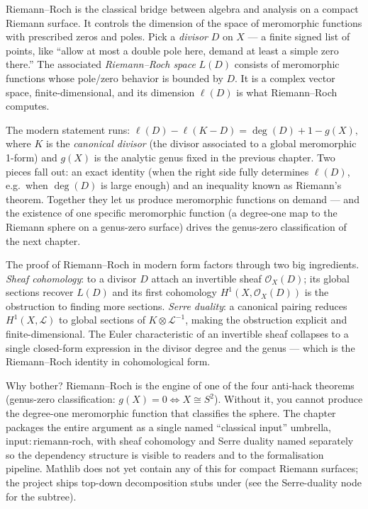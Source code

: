 \begin{layman}
Riemann--Roch is the classical bridge between algebra and analysis on
a compact Riemann surface. It controls the dimension of the space of
meromorphic functions with prescribed zeros and poles. Pick a
\emph{divisor} \(D\) on \(X\) --- a finite signed list of points, like
``allow at most a double pole here, demand at least a simple zero
there.'' The associated \emph{Riemann--Roch space} \(L(D)\) consists
of meromorphic functions whose pole/zero behavior is bounded by
\(D\). It is a complex vector space, finite-dimensional, and its
dimension \(\ell(D)\) is what Riemann--Roch computes.

The modern statement runs:
\(\ell(D) - \ell(K - D) = \deg(D) + 1 - g(X),\)
where \(K\) is the \emph{canonical divisor} (the divisor associated
to a global meromorphic 1-form) and \(g(X)\) is the analytic genus
fixed in the previous chapter. Two pieces fall out: an exact
identity (when the right side fully determines \(\ell(D)\), e.g.\
when \(\deg(D)\) is large enough) and an inequality known as
Riemann's theorem. Together they let us produce meromorphic
functions on demand --- and the existence of one specific meromorphic
function (a degree-one map to the Riemann sphere on a genus-zero
surface) drives the genus-zero classification of the next chapter.

The proof of Riemann--Roch in modern form factors through two big
ingredients. \emph{Sheaf cohomology}: to a divisor \(D\) attach an
invertible sheaf \(\mathcal{O}_X(D)\); its global sections recover
\(L(D)\) and its first cohomology \(H^1(X,\mathcal{O}_X(D))\) is
the obstruction to finding more sections. \emph{Serre duality}: a
canonical pairing reduces \(H^1(X,\mathcal{L})\) to global
sections of \(K \otimes \mathcal{L}^{-1}\), making the obstruction
explicit and finite-dimensional. The Euler characteristic of an
invertible sheaf collapses to a single closed-form expression in
the divisor degree and the genus --- which is the Riemann--Roch
identity in cohomological form.

Why bother? Riemann--Roch is the engine of one of the four anti-hack
theorems (genus-zero classification: \(g(X) = 0 \iff X
\cong S^2\)). Without it, you cannot produce the degree-one
meromorphic function that classifies the sphere. The chapter packages
the entire argument as a single named ``classical input'' umbrella,
\(\mathrm{input{:}riemann\text{-}roch}\), with sheaf cohomology and
Serre duality named separately so the dependency structure is
visible to readers and to the formalisation pipeline. Mathlib does
not yet contain any of this for compact Riemann surfaces; the
project ships top-down decomposition stubs under
 (see the Serre-duality node
for the subtree).
\end{layman}


